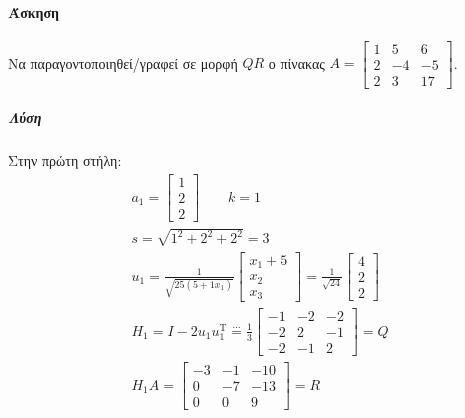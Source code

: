 \documentclass[11pt,a4paper,notitlepage,fleqn,final]{article}
\begin{document}
\paragraph{Άσκηση}
Να παραγοντοποιηθεί/γραφεί σε μορφή \( QR \) ο πίνακας \( A =
\left[\begin{matrix}
1&5&6\\2&-4&-5\\2&3&17
\end{matrix}\right] \).
\subparagraph{Λύση}
Στην πρώτη στήλη:
\begin{gather*}
	a_1 = \left[\begin{matrix}
	1\\2\\2
	\end{matrix}\right] \qquad k=1 \\
	s=\sqrt{1^2+2^2+2^2}=3 \\
	u_1 = \frac{1}{\sqrt{25(5+1x_1)}}\left[\begin{matrix}
	x_1+5\\x_2\\x_3
	\end{matrix}\right] = \frac{1}{\sqrt{24}}\left[\begin{matrix}
	4\\2\\2
	\end{matrix}\right] \\
	H_1 = I-2u_1u_1^{\mathrm T} \overset{\cdots}{=}
	\frac{1}{3}\left[\begin{matrix}
	-1&-2&-2\\-2&2&-1\\-2&-1&2
	\end{matrix}\right] = Q \\
	H_1A = \left[\begin{matrix}
	-3&-1&-10\\0&-7&-13\\0&0&9
	\end{matrix}\right] = R
\end{gather*}
\end{document}

